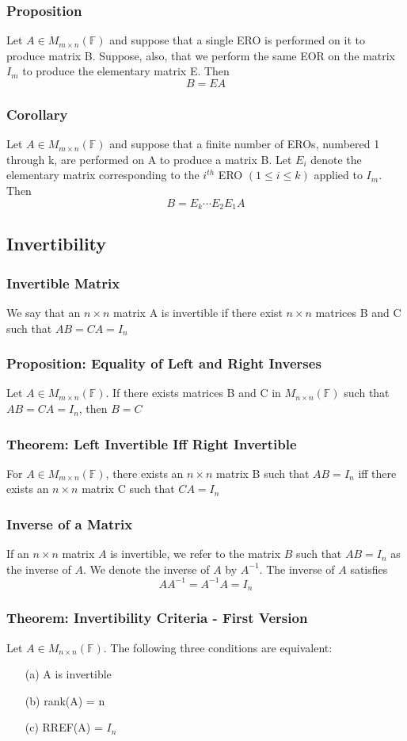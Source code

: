 \documentclass[12pt, letterpaper]{article}
\begin{document}
\subsubsection{Proposition}
Let $A\in M_{m\times n}(\mathbb{F})$ and suppose that a single ERO is performed on it to produce matrix B. Suppose, also, 
that we perform the same EOR on the matrix $I_m$ to produce the elementary matrix E. Then \[B = EA\] 
\subsubsection{Corollary}
Let $A\in M_{m\times n}(\mathbb{F})$ and suppose that a finite number of EROs, numbered 1 through k, are performed on A to produce 
a matrix B. Let $E_i$ denote the elementary matrix corresponding to the $i^{th}$ ERO $(1\leq i\leq k)$ applied to $I_m$. Then \[B = E_k\cdots E_2 E_1 A\]
\subsection{Invertibility}
\subsubsection{Invertible Matrix}
We say that an $n\times n$ matrix A is invertible if there exist $n\times n$ matrices B and C such that $AB = CA = I_n$
\subsubsection{Proposition: Equality of Left and Right Inverses}
Let $A\in M_{m\times n}(\mathbb{F})$. If there exists matrices B and C in $M_{n\times n}(\mathbb{F})$ such that $AB = CA = I_n$, then $B=C$
\subsubsection{Theorem: Left Invertible Iff Right Invertible}
For $A\in M_{m\times n}(\mathbb{F})$, there exists an $n\times n$ matrix B such that $AB = I_n$ iff there exists an $n\times n$ matrix C such that $CA = I_n$
\subsubsection{Inverse of a Matrix}
If an $n\times n$ matrix $A$ is invertible, we refer to the matrix $B$ such that $AB = I_n$ as the inverse of $A$. 
We denote the inverse of $A$ by $A^{-1}$. The inverse of $A$ satisfies \[AA^{-1} = A^{-1}A = I_n\]
\subsubsection{Theorem: Invertibility Criteria - First Version} 
Let $A\in M_{n\times n}(\mathbb{F})$. The following three conditions are equivalent:
\begin{enumerate}
    \item[(a)] A is invertible 
    \item[(b)] rank(A) = n 
    \item[(c)] RREF(A) = $I_n$  
\end{enumerate}
\end{document}
